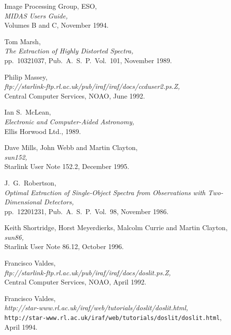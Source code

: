 {{\begin{thebibliography}{999}
 Image Processing Group, ESO,\\
      {\sl MIDAS Users Guide,}\\
      Volumes B and C, November 1994.

 Tom Marsh,\\
      {\sl The Extraction of Highly Distorted Spectra,}\\
      pp.~1032\scspec{--}{-}1037, Pub.~A.~S.~P.~Vol.~101, November 1989.

 Philip Massey,\\
      {\sl
      {ftp://starlink-ftp.rl.ac.uk/pub/iraf/iraf/docs/ccduser2.ps.Z},}\\
      Central Computer Services, NOAO, June 1992.

 Ian S.~McLean,\\
      {\sl Electronic and Computer-Aided Astronomy,}\\
      Ellis Horwood Ltd., 1989.

 Dave Mills, John Webb and Martin Clayton,\\
      {\sl {}
      {sun152}{},}\\
      Starlink User Note 152.2, December 1995.

 J.~G.~Robertson,\\
     {\sl Optimal Extraction of Single-Object Spectra from Observations
     with Two-Dimensional Detectors,}\\
     pp.~1220\scspec{--}{-}1231, Pub.~A.~S.~P.~Vol.~98, November 1986.

 Keith Shortridge, Horst Meyerdierks, Malcolm Currie and
      Martin Clayton,\\
      {\sl {}
      {sun86}{},}\\
      Starlink User Note 86.12, October 1996.

 Francisco Valdes,\\
      {\sl
      {ftp://starlink-ftp.rl.ac.uk/pub/iraf/iraf/docs/doslit.ps.Z},}\\
      Central Computer Services, NOAO, April 1992.

 Francisco Valdes,\\
      {\sl
      {http://star-www.rl.ac.uk/iraf/web/tutorials/doslit/doslit.html},}\\
      {\tt http://star-www.rl.ac.uk/iraf/web/tutorials/doslit/doslit.html},
      \\
      April 1994.


\end{thebibliography}}}

